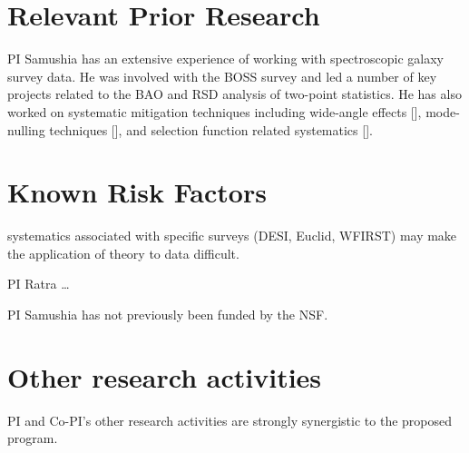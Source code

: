 



\section{Relevant Prior Research}

PI Samushia has an extensive experience of working with spectroscopic galaxy
survey data. He was involved with the BOSS survey and led a number of key
projects related to the BAO and RSD analysis of two-point statistics. He has
also worked on systematic mitigation techniques including wide-angle effects
[], mode-nulling techniques [], and selection function related systematics [].





\section{Known Risk Factors}






systematics associated with specific surveys (DESI, Euclid, WFIRST) may make
the application of theory to data difficult. 


PI Ratra \ldots

PI Samushia has not previously been funded by the NSF.

\section{Other research activities}

PI and Co-PI's other research activities are strongly synergistic to the
proposed program.

